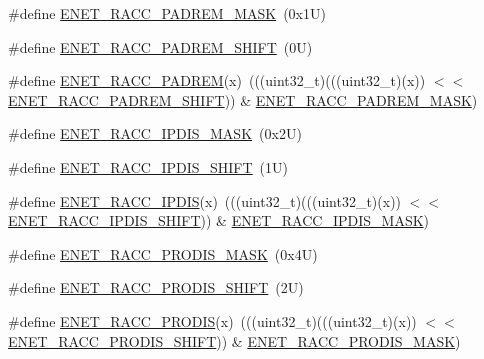 \begin{DoxyCompactItemize}
\item 
\#define \mbox{\hyperlink{group___e_n_e_t___register___masks_gafe0e825e683582136a9e9c723b59119a}{E\+N\+E\+T\+\_\+\+R\+A\+C\+C\+\_\+\+P\+A\+D\+R\+E\+M\+\_\+\+M\+A\+SK}}~(0x1\+U)
\item 
\#define \mbox{\hyperlink{group___e_n_e_t___register___masks_gad53cc0a7d4324a869efd43688f6bb88e}{E\+N\+E\+T\+\_\+\+R\+A\+C\+C\+\_\+\+P\+A\+D\+R\+E\+M\+\_\+\+S\+H\+I\+FT}}~(0\+U)
\item 
\#define \mbox{\hyperlink{group___e_n_e_t___register___masks_ga8e7a1a1f2dfcbc219403e8aa2fd32f45}{E\+N\+E\+T\+\_\+\+R\+A\+C\+C\+\_\+\+P\+A\+D\+R\+EM}}(x)~(((uint32\+\_\+t)(((uint32\+\_\+t)(x)) $<$$<$ \mbox{\hyperlink{group___e_n_e_t___register___masks_gad53cc0a7d4324a869efd43688f6bb88e}{E\+N\+E\+T\+\_\+\+R\+A\+C\+C\+\_\+\+P\+A\+D\+R\+E\+M\+\_\+\+S\+H\+I\+FT}})) \& \mbox{\hyperlink{group___e_n_e_t___register___masks_gafe0e825e683582136a9e9c723b59119a}{E\+N\+E\+T\+\_\+\+R\+A\+C\+C\+\_\+\+P\+A\+D\+R\+E\+M\+\_\+\+M\+A\+SK}})
\item 
\#define \mbox{\hyperlink{group___e_n_e_t___register___masks_gaa80ccc3df7b2b157efa6363fa2cbb66f}{E\+N\+E\+T\+\_\+\+R\+A\+C\+C\+\_\+\+I\+P\+D\+I\+S\+\_\+\+M\+A\+SK}}~(0x2\+U)
\item 
\#define \mbox{\hyperlink{group___e_n_e_t___register___masks_gacdb8d85ecbbc4e98709f880277fd4e3c}{E\+N\+E\+T\+\_\+\+R\+A\+C\+C\+\_\+\+I\+P\+D\+I\+S\+\_\+\+S\+H\+I\+FT}}~(1\+U)
\item 
\#define \mbox{\hyperlink{group___e_n_e_t___register___masks_ga2d1116e4f9d9b1265fea900b984167d9}{E\+N\+E\+T\+\_\+\+R\+A\+C\+C\+\_\+\+I\+P\+D\+IS}}(x)~(((uint32\+\_\+t)(((uint32\+\_\+t)(x)) $<$$<$ \mbox{\hyperlink{group___e_n_e_t___register___masks_gacdb8d85ecbbc4e98709f880277fd4e3c}{E\+N\+E\+T\+\_\+\+R\+A\+C\+C\+\_\+\+I\+P\+D\+I\+S\+\_\+\+S\+H\+I\+FT}})) \& \mbox{\hyperlink{group___e_n_e_t___register___masks_gaa80ccc3df7b2b157efa6363fa2cbb66f}{E\+N\+E\+T\+\_\+\+R\+A\+C\+C\+\_\+\+I\+P\+D\+I\+S\+\_\+\+M\+A\+SK}})
\item 
\#define \mbox{\hyperlink{group___e_n_e_t___register___masks_ga853ee7c551a69a87b8bb9feb9e6bcd42}{E\+N\+E\+T\+\_\+\+R\+A\+C\+C\+\_\+\+P\+R\+O\+D\+I\+S\+\_\+\+M\+A\+SK}}~(0x4\+U)
\item 
\#define \mbox{\hyperlink{group___e_n_e_t___register___masks_ga5fc6d1cec21b565a6c3a6fba5b9b61a4}{E\+N\+E\+T\+\_\+\+R\+A\+C\+C\+\_\+\+P\+R\+O\+D\+I\+S\+\_\+\+S\+H\+I\+FT}}~(2\+U)
\item 
\#define \mbox{\hyperlink{group___e_n_e_t___register___masks_ga58929dc293f313e3ca2fe570dd549f14}{E\+N\+E\+T\+\_\+\+R\+A\+C\+C\+\_\+\+P\+R\+O\+D\+IS}}(x)~(((uint32\+\_\+t)(((uint32\+\_\+t)(x)) $<$$<$ \mbox{\hyperlink{group___e_n_e_t___register___masks_ga5fc6d1cec21b565a6c3a6fba5b9b61a4}{E\+N\+E\+T\+\_\+\+R\+A\+C\+C\+\_\+\+P\+R\+O\+D\+I\+S\+\_\+\+S\+H\+I\+FT}})) \& \mbox{\hyperlink{group___e_n_e_t___register___masks_ga853ee7c551a69a87b8bb9feb9e6bcd42}{E\+N\+E\+T\+\_\+\+R\+A\+C\+C\+\_\+\+P\+R\+O\+D\+I\+S\+\_\+\+M\+A\+SK}})
$$
\end{DoxyCompactItemize}
